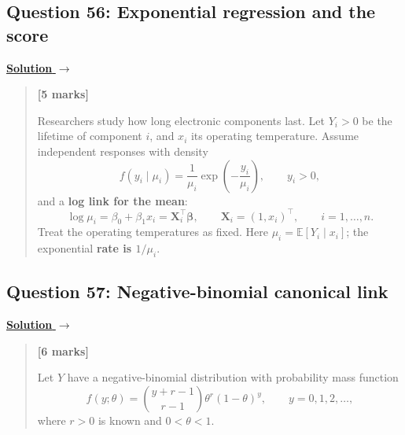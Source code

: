\documentclass[11pt,a4paper]{article}
\newcommand{\given}{\mathrel{|}}
\newcommand{\E}{\mathbb{E}}
\newcommand{\partmarks}[1]{%
  \unskip\nobreak\hfill\penalty50\hskip1em\null\nobreak\hfill
  \mbox{\textbf{[#1]}}}
\newenvironment{examquestion}[2]
  {\subsection{#1}\label{question:\arabic{subsection}}\label{#2}%
   \noindent\hyperref[answer:\arabic{subsection}]{\textbf{Solution} $\rightarrow$}%
   \begin{quote}\color{statgrey}}
  {\end{quote}}
\begin{document}
\begin{examquestion}{Question 56: Exponential regression and the score}{question:practice-exponential-regression-and-the-score}
\textbf{[5 marks]}

Researchers study how long electronic components last. Let $Y_i>0$ be
the lifetime of component $i$, and $x_i$ its operating temperature.
Assume independent responses with density
\[
f(y_i\given\mu_i)
=\frac1{\mu_i}\exp\left(-\frac{y_i}{\mu_i}\right),
\qquad y_i>0,
\]
and a \textbf{log link for the mean}:
\[
\log\mu_i=\beta_0+\beta_1x_i
=\mathbf X_i^\top\boldsymbol\beta,\qquad
\mathbf X_i=(1,x_i)^\top,\qquad i=1,\ldots,n.
\]
Treat the operating temperatures as fixed. Here
$\mu_i=\E[Y_i\given x_i]$; the exponential \textbf{rate is $1/\mu_i$}.

\end{examquestion}

\clearpage

\begin{examquestion}{Question 57: Negative-binomial canonical link}{question:practice-negative-binomial-canonical-link}
\textbf{[6 marks]}

Let $Y$ have a negative-binomial distribution with probability mass function
\[
f(y;\theta)
=\binom{y+r-1}{r-1}\theta^r(1-\theta)^y,
\qquad y=0,1,2,\ldots,
\]
where $r>0$ is known and $0<\theta<1$.

\end{examquestion}
\end{document}
